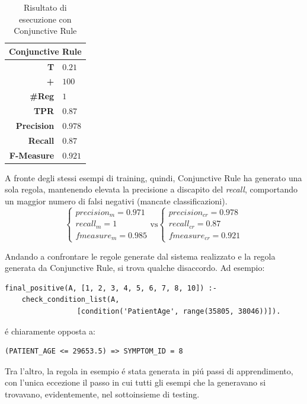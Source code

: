 \documentclass[preprint]{acm_proc_article-sp}
\begin{document}
\begin{table}[h]
\centering
\begin{tabular}{|r|l|} \hline
\multicolumn{2}{|c|}{\textbf{Conjunctive Rule}} \\ \hline \hline 
\textbf{T} & $0.21$ \\ \hline
\textbf{+} & $100$ \\ \hline
\textbf{\#Reg} & $1$\\ \hline
\textbf{TPR} & $0.87$ \\ \hline
\textbf{Precision} & $0.978$ \\ \hline
\textbf{Recall} & $0.87$ \\  \hline
\textbf{F-Measure} & $0.921$ \\
\hline\end{tabular}
\caption{Risultato di esecuzione con Conjunctive Rule}
\label{table:risultati-conjunctive-rule}
\end{table}

A fronte degli stessi esempi di training, quindi, Conjunctive Rule ha generato una sola regola, mantenendo elevata la precisione a discapito del \textit{recall}, comportando un maggior numero di falsi negativi (mancate classificazioni).
\[
\begin{cases}
precision_m = 0.971 \\
recall_m = 1 \\
fmeasure_m = 0.985
\end{cases}
\mbox{vs}
\begin{cases}
precision_{cr} = 0.978 \\
recall_{cr} = 0.87 \\
fmeasure_{cr} = 0.921
\end{cases}
\]

Andando a confrontare le regole generate dal sistema realizzato e la regola generata da Conjunctive Rule, si trova qualche disaccordo. Ad esempio:
\begin{verbatim}
final_positive(A, [1, 2, 3, 4, 5, 6, 7, 8, 10]) :-
	check_condition_list(A,
			     [condition('PatientAge', range(35805, 38046))]).
\end{verbatim}
\'e chiaramente opposta a:
\begin{verbatim}
(PATIENT_AGE <= 29653.5) => SYMPTOM_ID = 8
\end{verbatim}

Tra l'altro, la regola in esempio \'e stata generata in pi\'u passi di apprendimento, con l'unica eccezione il passo in cui tutti gli esempi che la generavano si trovavano, evidentemente, nel sottoinsieme di testing.
\end{document}

